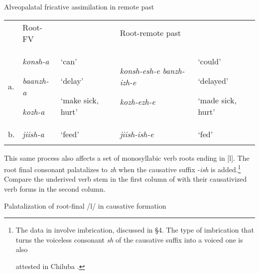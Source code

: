 \documentclass[output=paper]{langsci/langscibook}
\begin{document}
\begin{table}
\caption{Alveopalatal fricative assimilation in remote past}
\label{tab:5}
\end{table}

\begin{tabular}{lllll} & \mdseries Root-FV &  & \multicolumn{2}{l}{\mdseries Root-remote past}\\
\lsptoprule
\mdseries a. & {\mdseries \emph{konsh-a}}

{\mdseries \emph{baanzh-a}}

\mdseries \emph{kozh-a  } & {\mdseries ‘can’}

{\mdseries ‘delay’  }

\mdseries ‘make sick, hurt’ & {\mdseries \emph{konsh-esh-e banzh-izh-e}}

\mdseries \emph{kozh-ezh-e} & {\mdseries ‘could’}

{\mdseries ‘delayed’}

\mdseries ‘made sick, hurt’\\
\mdseries b. & \mdseries \emph{jiish-a} & \mdseries ‘feed’ & \mdseries \emph{jiish-ish-e} & \mdseries ‘fed’\\
\lspbottomrule
\end{tabular}
\begin{styleBodyTextIndent}
This same process also affects a set of monosyllabic verb roots ending in [l]. The root final consonant palatalizes to \emph{zh} when the causative suffix -\emph{ish} is added.\footnote{ The data in  involve imbrication, discussed in §4. The type of imbrication that       turns the voiceless consonant \emph{sh} of the causative suffix into a voiced one is also\par        attested in Chiluba \citep[73]{Lukusa1993}.\par } Compare the underived verb stem in the first column of  with their causativized verb forms in the second column.
\end{styleBodyTextIndent}

\begin{table}
\caption{Palatalization of root-final /l/ in causative formation}
\label{tab:6}
\end{table}
\end{document}
